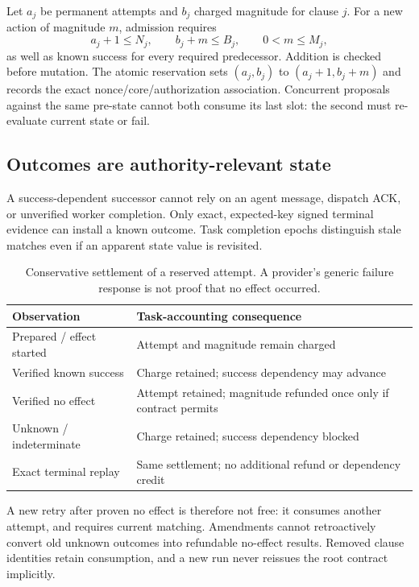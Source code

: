 \documentclass[letterpaper,twocolumn,10pt]{article}
\begin{document}
Let $a_j$ be permanent attempts and $b_j$ charged magnitude for clause $j$.
For a new action of magnitude $m$, admission requires
\[
 a_j+1\leq N_j,\qquad b_j+m\leq B_j,\qquad 0<m\leq M_j,
\]
as well as known success for every required predecessor. Addition is checked
before mutation. The atomic reservation sets $(a_j,b_j)$ to
$(a_j+1,b_j+m)$ and records the exact nonce/core/authorization association.
Concurrent proposals against the same pre-state cannot both consume its last
slot: the second must re-evaluate current state or fail.

\subsection{Outcomes are authority-relevant state}

A success-dependent successor cannot rely on an agent message, dispatch ACK,
or unverified worker completion. Only exact, expected-key signed terminal
evidence can install a known outcome. Task completion epochs distinguish stale
matches even if an apparent state value is revisited.

\begin{table}[t]
\centering
\caption{Conservative settlement of a reserved attempt. A provider's generic
failure response is not proof that no effect occurred.}
\label{tab:outcomes}
\begin{tabularx}{\columnwidth}{@{}YY@{}}
\toprule
Observation & Task-accounting consequence \\
\midrule
Prepared / effect started & Attempt and magnitude remain charged \\
Verified known success & Charge retained; success dependency may advance \\
Verified no effect & Attempt retained; magnitude refunded once only if contract permits \\
Unknown / indeterminate & Charge retained; success dependency blocked \\
Exact terminal replay & Same settlement; no additional refund or dependency credit \\
\bottomrule
\end{tabularx}
\end{table}

A new retry after proven no effect is therefore not free: it consumes another
attempt, and requires current matching. Amendments cannot retroactively convert
old unknown outcomes into refundable no-effect results. Removed clause identities
retain consumption, and a new run never reissues the root contract implicitly.
\end{document}
